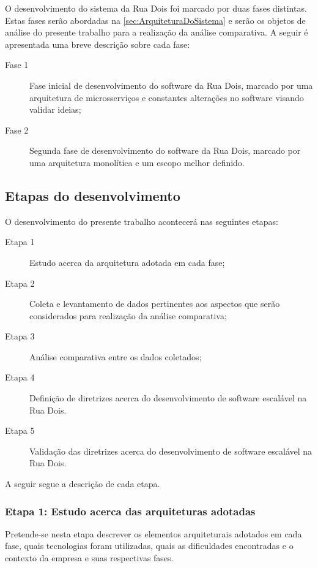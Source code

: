 O desenvolvimento do sistema da Rua Dois foi marcado por duas fases distintas.
Estas fases serão abordadas na \autoref{sec:ArquiteturaDoSistema} e serão
os objetos de análise do presente trabalho para a realização da análise
comparativa. A seguir é apresentada uma breve descrição sobre cada fase:

    \begin{description}
        \item [Fase 1] Fase inicial de desenvolvimento do software da Rua Dois,
        marcado por uma arquitetura de microsserviços e constantes alterações
        no software visando validar ideias;
        \item [Fase 2] Segunda fase de desenvolvimento do software da Rua Dois,
        marcado por uma arquitetura monolítica e um escopo melhor definido.
    \end{description}

\subsection{Etapas do desenvolvimento}
\label{sec:EtapasDoDesenvolvimento}

O desenvolvimento do presente trabalho acontecerá nas seguintes etapas:

    \begin{description}
        \item[Etapa 1] Estudo acerca da arquitetura adotada em cada fase;
        \item[Etapa 2] Coleta e levantamento de dados pertinentes aos aspectos que serão
        considerados para realização da análise comparativa;
        \item[Etapa 3] Análise comparativa entre os dados coletados;
        \item[Etapa 4] Definição de diretrizes acerca do desenvolvimento de software
        escalável na Rua Dois.
        \item[Etapa 5] Validação das diretrizes acerca do desenvolvimento de software
        escalável na Rua Dois.
    \end{description}

A seguir segue a descrição de cada etapa.

\subsubsection{Etapa 1: Estudo acerca das arquiteturas adotadas}

Pretende-se nesta etapa descrever os elementos arquiteturais adotados em cada fase,
quais tecnologias foram utilizadas, quais as dificuldades encontradas e o contexto
da empresa e suas respectivas fases.

